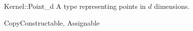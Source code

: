 \begin{ccRefConcept}{Kernel::Point_d}
A type representing points in $d$ dimensions.

\ccRefines
CopyConstructable, Assignable

\ccSeeAlso
{} \\
 \\

\end{ccRefConcept}
